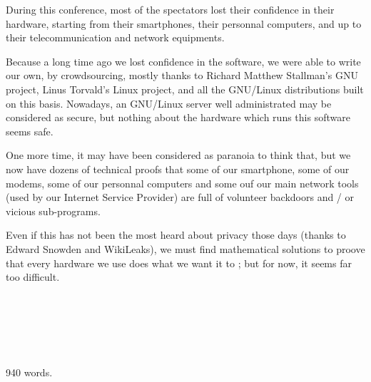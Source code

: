 \documentclass[DIV=calc, paper=a4, fontsize=11pt, twocolumn]{scrartcl} %
\begin{document}
During this conference, most of the spectators lost their confidence in their hardware, starting from their smartphones, their personnal computers, and up to their telecommunication and network equipments. 

Because a long time ago we lost confidence in the software, we were able to write our own, by crowdsourcing, mostly thanks to Richard Matthew Stallman's GNU project, Linus Torvald's Linux project, and all the GNU/Linux distributions built on this basis. Nowadays, an GNU/Linux server well administrated may be considered as secure, but nothing about the hardware which runs this software seems safe.

One more time, it may have been considered as paranoia to think that, but we now have dozens of technical proofs that some of our smartphone, some of our modems, some of our personnal computers and some ouf our main network tools (used by our Internet Service Provider) are full of volunteer backdoors and / or vicious sub-programs.

Even if this has not been the most heard about privacy those days (thanks to Edward Snowden and WikiLeaks), we must find mathematical solutions to proove that every hardware we use does what we want it to ; but for now, it seems far too difficult.

~

~

~

940 words.
\end{document}
